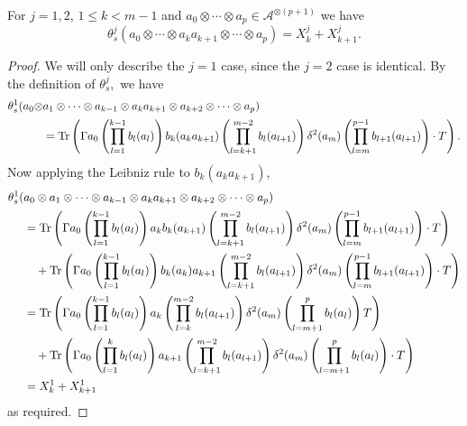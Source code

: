     \begin{lem}\label{kogom app 2}
        For $j = 1,2$, $1 \leq k < m-1$ and $a_0\otimes\cdots\otimes a_p \in \mathcal{A}^{\otimes (p+1)}$ we have
        \begin{equation*}
            \theta_s^j(a_0\otimes \cdots\otimes a_{k}a_{k+1}\otimes\cdots\otimes a_p) = X_k^j+X_{k+1}^j.
        \end{equation*}
    \end{lem}
    \begin{proof} 
        We will only describe the $j=1$ case, since the $j=2$ case is identical. By the definition of $\theta_s^j,$ we have
        \begin{align*}
            \theta_s^1(a_0\otimes &a_1\otimes\cdots\otimes a_{k-1}\otimes a_{k}a_{k+1}\otimes a_{k+2}\otimes\cdots\otimes a_p)\\
                                  &= {\rm Tr}\left(\Gamma a_0\left(\prod_{l=1}^{k-1}b_l(a_l)\right)b_k(a_ka_{k+1})\left(\prod_{l=k+1}^{m-2}b_l(a_{l+1})\right)\delta^2(a_m)\left(\prod_{l=m}^{p-1}b_{l+1}(a_{l+1})\right)\cdot T\right).
        \end{align*}
        Now applying the Leibniz rule to $b_k(a_ka_{k+1})$,
        \begin{align*}
            \theta_s^1(&a_0\otimes a_1\otimes\cdots\otimes a_{k-1}\otimes a_{k}a_{k+1}\otimes a_{k+2}\otimes\cdots\otimes a_p)\\
                                  &= {\rm Tr}\left(\Gamma a_0\left(\prod_{l=1}^{k-1}b_l(a_l)\right) a_k b_k(a_{k+1})\left(\prod_{l=k+1}^{m-2}b_l(a_{l+1})\right)\delta^2(a_m)\left(\prod_{l=m}^{p-1}b_{l+1}(a_{l+1})\right)\cdot T\right)\\
                                  &\quad + {\rm Tr}\left(\Gamma a_0\left(\prod_{l=1}^{k-1}b_l(a_l)\right)b_k(a_k)a_{k+1}\left(\prod_{l=k+1}^{m-2}b_l(a_{l+1})\right)\delta^2(a_m)\left(\prod_{l=m}^{p-1}b_{l+1}(a_{l+1})\right)\cdot T\right)\\
                                  &= {\rm Tr}\left(\Gamma a_0\left(\prod_{l=1}^{k-1}b_l(a_l)\right) a_k\left(\prod_{l=k}^{m-2}b_l(a_{l+1})\right)\delta^2(a_m)\left(\prod_{l=m+1}^p b_l(a_l)\right) T\right)\\
                                  &\quad + {\rm Tr}\left(\Gamma a_0\left(\prod_{l=1}^kb_l(a_l)\right) a_{k+1}\left(\prod_{l=k+1}^{m-2}b_l(a_{l+1})\right)\delta^2(a_m)\left(\prod_{l=m+1}^pb_l(a_l)\right)\cdot T\right)\\
                                  &= X_k^1+X_{k+1}^1
        \end{align*}
        as required.
    \end{proof}

